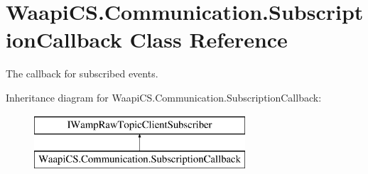 \hypertarget{class_waapi_c_s_1_1_communication_1_1_subscription_callback}{}\section{Waapi\+C\+S.\+Communication.\+Subscription\+Callback Class Reference}
\label{class_waapi_c_s_1_1_communication_1_1_subscription_callback}


The callback for subscribed events.  


Inheritance diagram for Waapi\+C\+S.\+Communication.\+Subscription\+Callback\+:\begin{figure}[H]
\begin{center}
\leavevmode
\includegraphics[height=2.000000cm]{class_waapi_c_s_1_1_communication_1_1_subscription_callback}
\end{center}
\end{figure}
